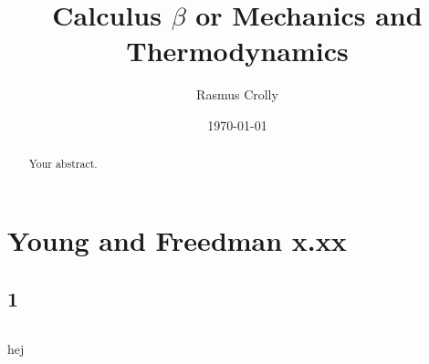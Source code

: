 \documentclass[12pt,a4paper]{article}
\title{Calculus $\beta$ or Mechanics and Thermodynamics}
\author{Rasmus Crolly}
\date{\today}
\begin{document}
\maketitle

\begin{abstract}
Your abstract.
\end{abstract}

\section{Young and Freedman x.xx}

\subsection{1}

\begin{lstlisting}[language=Python]
\end{lstlisting}

\printbibliography[
heading=bibintoc,
title={References}
]

hej
\end{document}
